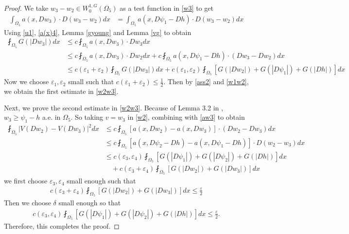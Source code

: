 \documentclass[10pt,a4paper]{article}
\theoremstyle{definition}
\numberwithin{equation}{section}
\begin{document}
	\begin{proof}
	We take $w_3 - w_2 \in W_0^{1,G}(\Omega_5)$ as a test function in \eqref{w3} to get
	\begin{align}\label{aw3}
		\int_{\Omega_5} a(x, Dw_3) \cdot D(w_3 - w_2) dx &= \int_{\Omega_5} a(x, D\psi_1 - Dh) \cdot D(w_3 - w_2) dx 
	\end{align}
	Using \eqref{u1}, \eqref{a(x)4}, Lemma \ref{gyoung} and Lemma \ref{vg} to obtain
	\begin{align*}
		\fint_{\Omega_5} G(|Dw_3|) dx &\le c \fint_{\Omega_5} a(x, Dw_3) \cdot Dw_3 dx \\
		&\le c \fint_{\Omega_5} a(x, Dw_3) \cdot Dw_2 dx + c \fint_{\Omega_5} a(x, D\psi_1 - Dh) \cdot (Dw_3 - Dw_2) dx \\
		&\le c(\varepsilon_1 + \varepsilon_2) \fint_{\Omega_5} G(|Dw_3|) dx + c(\varepsilon_1, \varepsilon_2) \fint_{\Omega_5}\left[  G(|Dw_2|) + G(|D\psi_1|) + G(|Dh|)\right]  dx
	\end{align*}
	Now we choose $\varepsilon_1, \varepsilon_2$ small such that $c(\varepsilon_1 + \varepsilon_2) \le \frac{1}{2}$.
	Then by \eqref{ass2} and \eqref{w1w2}, we obtain the first estimate in \eqref{w2w3}.
	
	Next, we prove the second estimate in \eqref{w2w3}.
	Because of Lemma  3.2  in \cite{blo}, $w_3 \ge \psi_1 - h$ a.e. in $\Omega_5$.
	So taking $v = w_3$ in \eqref{w2}, combining with \eqref{aw3} to obtain
	\begin{align*}
		\fint_{\Omega_5} |V(Dw_2) - V(Dw_3)|^2 dx &\le c \fint_{\Omega_5} \left[ a(x, Dw_2) - a(x, Dw_3)\right]  \cdot (Dw_2 - Dw_3) dx \\
		&\le c \fint_{\Omega_5} [a(x, D\psi_2 - Dh) - a(x, D\psi_1 - Dh)] \cdot D(w_2 - w_3) dx \\
		&\le c(\varepsilon_3, \varepsilon_4) \fint_{\Omega_5} [G(|D\psi_1|) + G(|D\psi_2|) + G(|Dh|)] dx \\
		&\quad + c(\varepsilon_3 + \varepsilon_4) \fint_{\Omega_5} [G(|Dw_2|) + G(|Dw_3|)] dx
	\end{align*}
	we first choose $\varepsilon_3, \varepsilon_4$ small enough such that
	\begin{align*}
		c(\varepsilon_3 + \varepsilon_4) \fint_{\Omega_5} \left[ G(|Dw_2|) + G(|Dw_3|)\right]  dx \le \frac{\varepsilon}{2}
	\end{align*}
	Then we choose $\delta$ small enough so that
	\begin{align*}
		c(\varepsilon_3, \varepsilon_4) \fint_{\Omega_5} [G(|D\psi_1|) + G(|D\psi_2|) + G(|Dh|)] dx \le \frac{\varepsilon}{2}.
	\end{align*}
		Therefore, this completes the proof.
	
	\end{proof}
	
\end{document}
